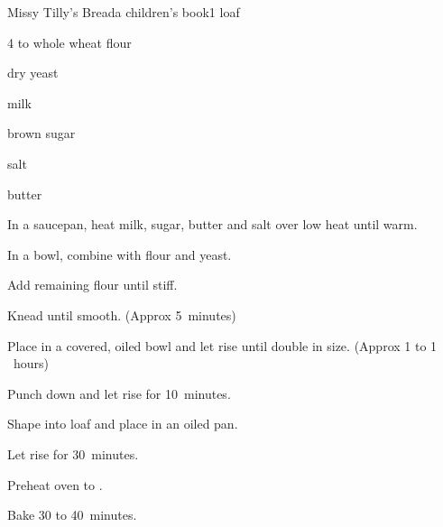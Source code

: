 \begin{recipe}{Missy Tilly's Bread}{a children's book}{1 loaf}

\begin{ingredients}
\item 4 to \C{4\third} whole wheat flour
\item \tp{4\half} dry yeast
\item \C{1\threequarter} milk
\item \C{\half} brown sugar
\item {} salt
\item {} butter
\end{ingredients}

\begin{directions}
\item In a saucepan, heat milk, sugar, butter and salt over low heat until warm.
\item In a bowl, combine with  flour and yeast.
\item Add remaining flour until stiff.
\item Knead until smooth. (Approx 5~minutes)
\item Place in a covered, oiled bowl and let rise until double in size. (Approx 1 to 1 \half~hours)
\item Punch down and let rise for 10~minutes.
\item Shape into loaf and place in an oiled pan.
\item Let rise for 30~minutes.
\item Preheat oven to .
\item Bake 30 to 40~minutes.
\end{directions}
\end{recipe}
